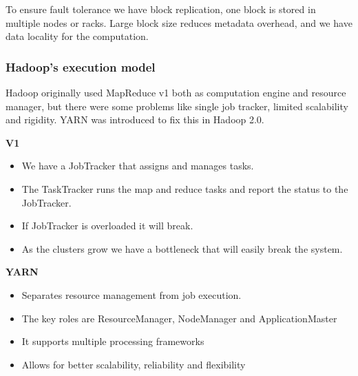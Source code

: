 To ensure fault tolerance we have block replication, one block is stored in multiple nodes or racks. Large block size reduces metadata overhead, and we have data locality for the computation. 

\subsubsection{Hadoop's execution model}

Hadoop originally used MapReduce v1 both as computation engine and resource manager, but there were some problems like single job tracker, limited scalability and rigidity. YARN was introduced to fix this in Hadoop 2.0.

\textbf{V1}

\begin{itemize}
    \item We have a JobTracker that assigns and manages tasks.
    \item The TaskTracker runs the map and reduce tasks and report the status to the JobTracker. 
    \item If JobTracker is overloaded it will break.
    \item As the clusters grow we have a bottleneck that will easily break the system.
\end{itemize}

\textbf{YARN}

\begin{itemize}
    \item Separates resource management from job execution.
    \item The key roles are ResourceManager, NodeManager and ApplicationMaster
    \item It supports multiple processing frameworks
    \item Allows for better scalability, reliability and flexibility
\end{itemize}

